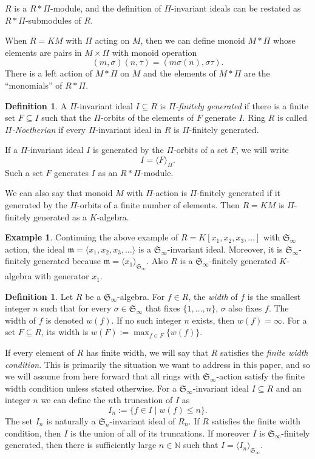 \documentclass{article}
\theoremstyle{plain}
\theoremstyle{definition}
\newtheorem{definition}[theorem]{Definition}
\newtheorem{example}[theorem]{Example}
\numberwithin{equation}{section}
\newcommand{\B}[1]{\mathbb #1}
\newcommand{\F}[1]{\mathfrak #1}
\newcommand{\ideal}[1]{\langle #1 \rangle}
\newcommand{\SymN}{\F S_\infty}
\newcommand{\mon}{M}
\newcommand{\Sym}{\F S_\infty}
\begin{document}
$R$ is a $R*\Pi$-module, and the definition of $\Pi$-invariant ideals can be restated as $R*\Pi$-submodules of $R$.

When $R = K\mon$ with $\Pi$ acting on $\mon$, then we can define monoid $\mon *\Pi$ whose elements are pairs in $\mon \times \Pi$ with monoid operation
 \[ (m, \sigma)(n, \tau) = (m\sigma(n), \sigma\tau). \]
There is a left action of $\mon*\Pi$ on $\mon$ and the elements of $\mon *\Pi$ are the ``monomials'' of $R*\Pi$.

\begin{definition}
 A $\Pi$-invariant ideal $I \subseteq R$ is {\em $\Pi$-finitely generated} if there is a finite set $F \subseteq I$ such that the $\Pi$-orbits of the elements of $F$ generate $I$.  Ring $R$ is called {\em $\Pi$-Noetherian} if every $\Pi$-invariant ideal in $R$ is $\Pi$-finitely generated.
\end{definition}
If a $\Pi$-invariant ideal $I$ is generated by the $\Pi$-orbits of a set $F$, we will write
 \[ I = \ideal{F}_{\Pi}. \]
Such a set $F$ generates $I$ as an $R*\Pi$-module.

We can also say that monoid $\mon$ with $\Pi$-action is $\Pi$-finitely generated if it generated by the $\Pi$-orbits of a finite number of elements.  Then $R = K\mon$ is $\Pi$-finitely generated as a $K$-algebra.

\begin{example}
 Continuing the above example of $R = K[x_1,x_2,x_3,\ldots]$ with $\SymN$ action, the ideal $\F m = \ideal{x_1,x_2,x_3,\ldots}$ is a $\SymN$-invariant ideal.  Moreover, it is $\SymN$-finitely generated because $\F m = \ideal{x_1}_{\SymN}$.  Also $R$ is a $\SymN$-finitely generated $K$-algebra with generator $x_1$.
\end{example}
 

\begin{definition}
 Let $R$ be a $\SymN$-algebra.  For $f \in R$, the {\em width} of $f$ is the smallest integer $n$ such that for every $\sigma \in \SymN$ that fixes $\{1,\ldots,n\}$, $\sigma$ also fixes $f$.  The width of $f$ is denoted $w(f)$.  If no such integer $n$ exists, then $w(f) = \infty$.  For a set $F \subseteq R$, its width is $w(F) := \max_{f \in F}\{w(f)\}$.
\end{definition}
If every element of $R$ has finite width, we will say that $R$ satisfies the {\em finite width condition}.  This is primarily the situation we want to address in this paper, and so we will assume from here forward that all rings with $\Sym$-action satisfy the finite width condition unless stated otherwise.  For a $\SymN$-invariant ideal $I \subseteq R$ and an integer $n$ we can define the $n$th truncation of $I$ as
 \[ I_n := \{ f \in I \mid w(f) \leq n \}. \]
The set $I_n$ is naturally a $\F S_n$-invariant ideal of $R_n$.  If $R$ satisfies the finite width condition, then $I$ is the union of all of its truncations.  If moreover $I$ is $\SymN$-finitely generated, then there is sufficiently large $n \in \B N$ such that $I = \ideal{I_n}_{\SymN}$.
\end{document}
